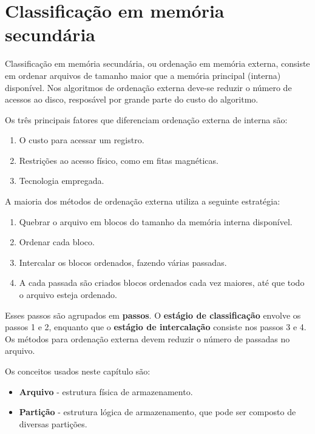 \chapter{Classificação em memória secundária}

Classificação em memória secundária, ou ordenação em memória externa, consiste
em ordenar arquivos de tamanho maior que a memória principal (interna)
disponível.
Nos algoritmos de ordenação externa deve-se reduzir o número de acessos ao disco,
resposável por grande parte do custo do algoritmo.


Os três principais fatores que diferenciam ordenação externa de interna são:
\begin{enumerate}
\item O custo para acessar um registro.
\item Restrições ao acesso físico, como em fitas magnéticas.
\item Tecnologia empregada.
\end{enumerate}

A maioria dos métodos de ordenação externa utiliza a seguinte estratégia:
\begin{enumerate}
\item Quebrar o arquivo em blocos do tamanho da memória interna disponível.
\item Ordenar cada bloco.
\item Intercalar os blocos ordenados, fazendo várias passadas.
\item A cada passada são criados blocos ordenados cada vez maiores, até que todo 
o arquivo esteja ordenado.
\end{enumerate}

Esses passos são agrupados em \textbf{passos}. 
O {\bf estágio de classificação} envolve os passos 1 e 2, enquanto que
o {\bf estágio de intercalação} consiste nos passos 3 e 4.
Os métodos para ordenação externa devem reduzir o número de passadas no arquivo.

Os conceitos usados neste capítulo são:
\begin{itemize}
\item {\bf Arquivo} - estrutura física de armazenamento. 
\item {\bf Partição} - estrutura lógica de armazenamento, que pode ser composto de
diversas partições.
\end{itemize}

